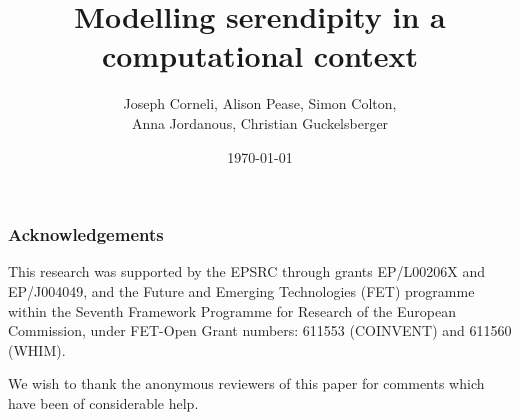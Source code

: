 \documentclass{llncs} %
\begin{document}
\title{Modelling serendipity in a computational context}
\author{Joseph Corneli, Alison Pease, Simon Colton,\\ Anna Jordanous, Christian Guckelsberger}
\date{\today}

\maketitle







% 
% 
% 
















\subsubsection*{Acknowledgements}
This research was supported by the EPSRC through grants EP/L00206X and
EP/J004049, and the Future and Emerging Technologies (FET) programme
within the Seventh Framework Programme for Research of the European
Commission, under FET-Open Grant numbers: 611553 (COINVENT) and 611560
(WHIM).

We wish to thank the anonymous reviewers of this paper for comments
which have been of considerable help.




% 
\end{document}
